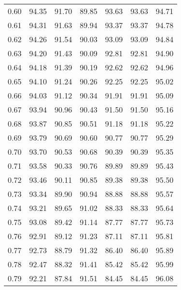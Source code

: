 \begin{tabular}{|c|c|c|c|c|c|c|}
      0.60 &     94.35 &     91.70 &      89.85 &   93.63 &      93.63 &         94.71 \\
      0.61 &     94.31 &     91.63 &      89.94 &   93.37 &      93.37 &         94.78 \\
      0.62 &     94.26 &     91.54 &      90.03 &   93.09 &      93.09 &         94.84 \\
      0.63 &     94.20 &     91.43 &      90.09 &   92.81 &      92.81 &         94.90 \\
      0.64 &     94.18 &     91.39 &      90.19 &   92.62 &      92.62 &         94.96 \\
      0.65 &     94.10 &     91.24 &      90.26 &   92.25 &      92.25 &         95.02 \\
      0.66 &     94.03 &     91.12 &      90.34 &   91.91 &      91.91 &         95.09 \\
      0.67 &     93.94 &     90.96 &      90.43 &   91.50 &      91.50 &         95.16 \\
      0.68 &     93.87 &     90.85 &      90.51 &   91.18 &      91.18 &         95.22 \\
      0.69 &     93.79 &     90.69 &      90.60 &   90.77 &      90.77 &         95.29 \\
      0.70 &     93.70 &     90.53 &      90.68 &   90.39 &      90.39 &         95.35 \\
      0.71 &     93.58 &     90.33 &      90.76 &   89.89 &      89.89 &         95.43 \\
      0.72 &     93.46 &     90.11 &      90.85 &   89.38 &      89.38 &         95.50 \\
      0.73 &     93.34 &     89.90 &      90.94 &   88.88 &      88.88 &         95.57 \\
      0.74 &     93.21 &     89.65 &      91.02 &   88.33 &      88.33 &         95.64 \\
      0.75 &     93.08 &     89.42 &      91.14 &   87.77 &      87.77 &         95.73 \\
      0.76 &     92.91 &     89.12 &      91.23 &   87.11 &      87.11 &         95.81 \\
      0.77 &     92.73 &     88.79 &      91.32 &   86.40 &      86.40 &         95.89 \\
      0.78 &     92.47 &     88.32 &      91.41 &   85.42 &      85.42 &         95.99 \\
      0.79 &     92.21 &     87.84 &      91.51 &   84.45 &      84.45 &         96.08 \\

\end{tabular}
